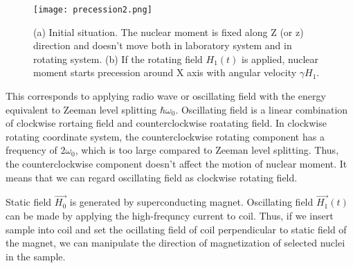 \begin{figure}
  \centering
  \texttt{[image: precession2.png]}
  \caption{(a) Initial situation.
  The nuclear moment is fixed along Z (or z) direction and doesn't move both in laboratory system and in rotating system.
  (b) If the rotating field $H_1 (t)$ is applied, nuclear moment starts precession around X axis with angular velocity $\gamma H_1$.}
  \label{precession2}
\end{figure}

This corresponds to applying radio wave or oscillating field with the energy equivalent to Zeeman level splitting $\hbar\omega_0$.
Oscillating field is a linear combination of clockwise rortaing field and counterclockwise roatating field.
In clockwise rotating coordinate system, the counterclockwise rotating component has a frequency of $2\omega_0$, which is too large compared to Zeeman level splitting.
Thus, the counterclockwise component doesn't affect the motion of nuclear moment.
It means that we can regard oscillating field as clockwise rotating field.

Static field $\overrightarrow{H_0}$ is generated by superconducting magnet.
Oscillating field $\overrightarrow{H_1}(t)$ can be made by applying the high-frequncy current to coil.
Thus, if we insert sample into coil and set the ocillating field of coil perpendicular to static field of the magnet,
we can manipulate the direction of magnetization of selected nuclei in the sample.

